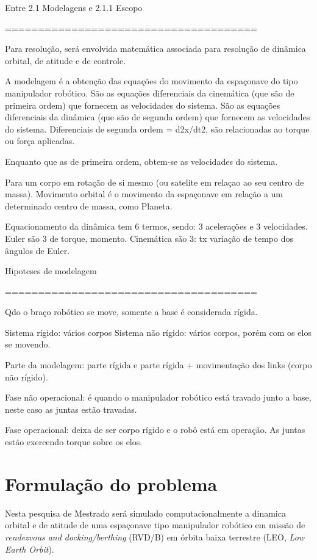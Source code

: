 Entre 2.1 Modelagens e 2.1.1 Escopo

======================================

Para resolução, será envolvida matemática associada para resolução de dinâmica orbital, de atitude e de controle. 

A modelagem é a obtenção das equações do movimento da espaçonave do tipo manipulador robótico.
São as equações diferenciais da cinemática (que são de primeira ordem) que fornecem as velocidades do sistema.
São as equações diferenciais da dinâmica (que são de segunda ordem) que fornecem as velocidades do sistema.
Diferenciais de segunda ordem = d2x/dt2, são relacionadas ao torque ou força aplicadas.  

Enquanto que as de primeira ordem, obtem-se as velocidades do sistema.

Para um corpo em rotação de si mesmo (ou satelite em relaçao ao seu centro de massa).
Movimento orbital é o movimento da espaçonave em relação a um determinado centro de massa, como Planeta.

Equacionamento da dinâmica tem 6 termos, sendo: 3 acelerações e 3 velocidades.
Euler são 3 de torque, momento.
Cinemática são 3: tx variação de tempo dos ângulos de Euler.

Hipoteses de modelagem

======================================

Qdo o braço robótico se move, somente a base é considerada rígida.

Sistema rígido: vários corpos
Sistema não rígido: vários corpos, porém com os elos se movendo.

Parte da modelagem: parte rígida e parte rígida + movimentação dos links (corpo não rígido).

Fase não operacional: é quando o manipulador robótico está travado junto a base, neste caso as juntas estão travadas.

Fase operacional: deixa de ser corpo rígido e o robô está em operação. As juntas estão exercendo torque sobre os elos.

\chapter{Formulação do problema}
Nesta pesquisa de Mestrado será simulado computacionalmente a dinamica orbital e de atitude de uma espaçonave tipo manipulador robótico em missão de \emph{rendezvous and docking/berthing} (RVD/B) em órbita baixa terrestre (LEO, \emph{Low Earth Orbit}).

